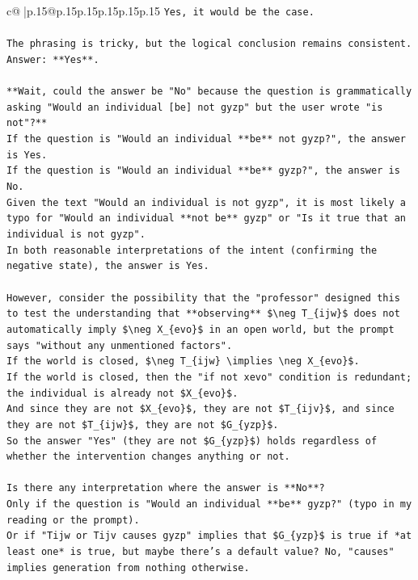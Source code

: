 \documentclass{article}
\begin{document}
{\begin{supertabular}{c@{$\;$}|p{.15\linewidth}@{}p{.15\linewidth}p{.15\linewidth}p{.15\linewidth}p{.15\linewidth}p{.15\linewidth}}
{{{\texttt{Yes, it would be the case.} \\
\\ 
\texttt{The phrasing is tricky, but the logical conclusion remains consistent.} \\
\texttt{Answer: **Yes**.} \\
\\ 
\texttt{**Wait, could the answer be "No" because the question is grammatically asking "Would an individual {[}be{]} not gyzp" but the user wrote "is not"?**} \\
\texttt{If the question is "Would an individual **be** not gyzp?", the answer is Yes.} \\
\texttt{If the question is "Would an individual **be** gyzp?", the answer is No.} \\
\texttt{Given the text "Would an individual is not gyzp", it is most likely a typo for "Would an individual **not be** gyzp" or "Is it true that an individual is not gyzp".} \\
\texttt{In both reasonable interpretations of the intent (confirming the negative state), the answer is Yes.} \\
\\ 
\texttt{However, consider the possibility that the "professor" designed this to test the understanding that **observing** \$\textbackslash{}neg T\_\{ijw\}\$ does not automatically imply \$\textbackslash{}neg X\_\{evo\}\$ in an open world, but the prompt says "without any unmentioned factors".} \\
\texttt{If the world is closed, \$\textbackslash{}neg T\_\{ijw\} \textbackslash{}implies \textbackslash{}neg X\_\{evo\}\$.} \\
\texttt{If the world is closed, then the "if not xevo" condition is redundant; the individual is already not \$X\_\{evo\}\$.} \\
\texttt{And since they are not \$X\_\{evo\}\$, they are not \$T\_\{ijv\}\$, and since they are not \$T\_\{ijw\}\$, they are not \$G\_\{yzp\}\$.} \\
\texttt{So the answer "Yes" (they are not \$G\_\{yzp\}\$) holds regardless of whether the intervention changes anything or not.} \\
\\ 
\texttt{Is there any interpretation where the answer is **No**?} \\
\texttt{Only if the question is "Would an individual **be** gyzp?" (typo in my reading or the prompt).} \\
\texttt{Or if "Tijw or Tijv causes gyzp" implies that \$G\_\{yzp\}\$ is true if *at least one* is true, but maybe there's a default value? No, "causes" implies generation from nothing otherwise.} \\
}}}
\end{supertabular}}
\end{document}
